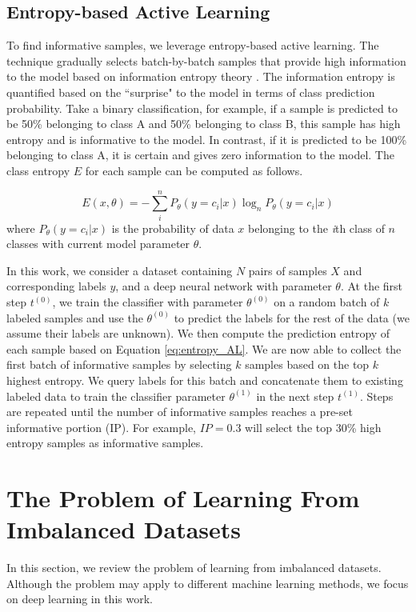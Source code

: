 \subsection{Entropy-based Active Learning }   
\label{sec:EAL}
To find informative samples, we leverage entropy-based active learning. The technique gradually selects batch-by-batch samples that provide high information to the model based on information entropy theory \cite{shannon_mathematical_1948}. The information entropy is quantified based on the ``surprise" to the model in terms of class prediction probability. Take a binary classification, for example, if a sample is predicted to be 50\% belonging to class A and 50\% belonging to class B, this sample has high entropy and is informative to the model. In contrast, if it is predicted to be 100\% belonging to class A, it is certain and gives zero information to the model. The class entropy $E$ for each sample can be computed as follows. 

\begin{equation}
E(x,\theta) = -\sum_i^n{ P_\theta( y=c_i|x) \log_n P_\theta(y=c_i|x) }
\label{eq:entropy_AL}
\end{equation} 
where $P_\theta(y=c_i|x)$ is the probability of data $x$ belonging to the \textit{i}th class of $n$ classes with current model parameter $\theta$.

In this work, we consider a dataset containing $N$ pairs of samples $X$ and corresponding labels $y$, and a deep neural network with parameter $\theta$. At the first step $t^{(0)}$, we train the classifier with parameter $\theta^{(0)}$ on a random batch of $k$ labeled samples and use the $\theta^{(0)}$ to predict the labels for the rest of the data (we assume their labels are unknown). We then compute the prediction entropy of each sample based on Equation \ref{eq:entropy_AL}. We are now able to collect the first batch of informative samples by selecting $k$ samples based on the top $k$ highest entropy. We query labels for this batch and concatenate them to existing labeled data to train the classifier parameter $\theta^{(1)}$ in the next step $t^{(1)}$. Steps are repeated until the number of informative samples reaches a pre-set informative portion (IP). For example, $IP=0.3$ will select the top 30\% high entropy samples as informative samples.  

\section{The Problem of Learning From Imbalanced Datasets}
\label{sec:problem}
In this section, we review the problem of learning from imbalanced datasets. Although the problem may apply to different machine learning methods, we focus on deep learning in this work. 

